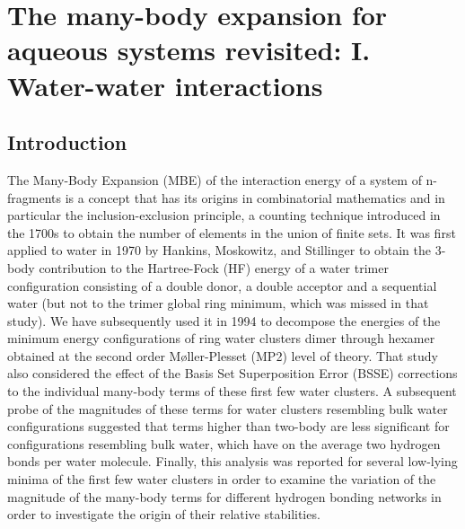 \documentclass[11pt, proquest]{uwthesis}[2020/02/24]
\begin{document}
\textpages



\chapter{The many-body expansion for aqueous systems revisited: I. Water-water interactions}

\section{Introduction}

\par The Many-Body Expansion (MBE) of the interaction energy of a system of n-fragments is a concept that has its origins in combinatorial mathematics and in particular the inclusion-exclusion principle, a counting technique introduced in the 1700s to obtain the number of elements in the union of finite sets.\autocite{roberts_applied_2009} It was first applied to water in 1970 by Hankins, Moskowitz, and Stillinger\autocite{hankins_water_1970} to obtain the 3-body contribution to the Hartree-Fock (HF) energy of a water trimer configuration consisting of a double donor, a double acceptor and a sequential water (but not to the trimer global ring minimum, which was missed in that study). We have subsequently used it in 1994 to decompose the energies of the minimum energy configurations of ring water clusters dimer through hexamer obtained at the second order Møller-Plesset (MP2) level of theory.\autocite{xantheas_ab_1994} That study also considered the effect of the Basis Set Superposition Error (BSSE) corrections\autocite{boys_calculation_1970, xantheas_importance_1996} to the individual many-body terms of these first few water clusters. A subsequent probe of the magnitudes of these terms for water clusters resembling bulk water configurations suggested that terms higher than two-body are less significant for configurations resembling bulk water, which have on the average two hydrogen bonds per water molecule.\autocite{xantheas_significance_1996} Finally, this analysis was reported for several low-lying minima of the first few water clusters in order to examine the variation of the magnitude of the many-body terms for different hydrogen bonding networks in order to investigate the origin of their relative stabilities.\autocite{xantheas_cooperativity_2000}
\end{document}
